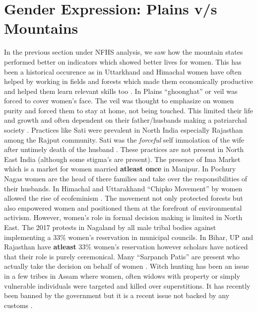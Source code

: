 \section{Gender Expression: Plains v/s Mountains}
In the previous section under NFHS analysis, we saw how the mountain states performed better on indicators which showed better lives for women. This has been a historical occurence as in Uttarkhand and Himachal women have often helped by  working in fields and forests which made them economically productive and helped them learn relevant skills too \citep{gooch2014daughters}. In Plains ``ghoonghat'' or veil was forced to cover women's face. The veil was thought to emphasize on women purity and forced them to stay at home, not being touched. This limited their life and growth and often dependent on their father/husbands making a patriarchal society \citep{chowdhry1993persistence}. Practices like Sati were prevalent in North India especially Rajasthan among the Rajput community. Sati was the \textit{forceful} self immolation of the wife after  untimely death of the husband \citep{sangari1981sati}. These practices are not present in North East India (although some stigma's are present). The presence of Ima Market which is a market for  women married \textbf{atleast once} in Manipur. In Pochury Nagas women are the head of there families and take over the responsibilities of their husbands. In Himachal and Uttarakhand ``Chipko Movement'' by women allowed the rise of ecofeminism \citep{moore2011eco}. The movement not only protected forests but also empowered women and positioned them at the forefront of environmental activism.  However, women's role in formal decision making is limited in North East. The 2017 protests in Nagaland by all male tribal bodies against implementing a 33\% women's reservation in municipal councils.  In Bihar, UP and Rajasthan have \textbf{atleast} 33\% women's reservation however scholars have noticed that their role is purely ceremonical. Many ``Sarpanch Patis'' are present who actually take the decision on behalf of women \citep{rajasekhar2016women}. Witch hunting has been an issue in a few tribes in Assam where  women, often widows with property or simply vulnerable individuals were targeted and killed over superstitions. It has recently been banned by the government but it is a recent issue not backed by any customs \citep{mishra2018targeting}.
